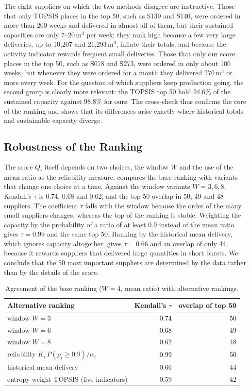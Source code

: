 \documentclass[11pt,a4paper]{article}
\begin{document}
The eight suppliers on which the two methods disagree are instructive.
Those that only TOPSIS places in the top 50, such as S139 and S140, were ordered in more than 200 weeks and delivered in almost all of them, but their sustained capacities are only 7--20\,m$^3$ per week; they rank high because a few very large deliveries, up to 10{,}207 and 21{,}293\,m$^3$, inflate their totals, and because the activity indicator rewards frequent small deliveries.
Those that only our score places in the top 50, such as S078 and S273, were ordered in only about 100 weeks, but whenever they were ordered for a month they delivered 270\,m$^3$ or more every week.
For the question of which suppliers keep production going, the second group is clearly more relevant: the TOPSIS top 50 hold 94.6\% of the sustained capacity against 98.8\% for ours.
The cross-check thus confirms the core of the ranking and shows that its differences arise exactly where historical totals and sustainable capacity diverge.

\subsection{Robustness of the Ranking}
The score $Q_i$ itself depends on two choices, the window $W$ and the use of the mean ratio as the reliability measure.
 compares the base ranking with variants that change one choice at a time.
Against the window variants $W=3,6,8$, Kendall's $\tau$ is 0.74, 0.68 and 0.62, and the top 50 overlap in 50, 49 and 48 suppliers.
The coefficient $\tau$ falls with the window because the order of the many small suppliers changes, whereas the top of the ranking is stable.
Weighting the capacity by the probability of a ratio of at least 0.9 instead of the mean ratio gives $\tau=0.99$ and the same top 50.
Ranking by the historical mean delivery, which ignores capacity altogether, gives $\tau=0.66$ and an overlap of only 44, because it rewards suppliers that delivered large quantities in short bursts.
We conclude that the 50 most important suppliers are determined by the data rather than by the details of the score.

\begin{table}[ht]
\centering
\caption{Agreement of the base ranking ($W=4$, mean ratio) with alternative rankings.}\label{tab:q1rob}
\small
\begin{tabular}{lrr}
\toprule
Alternative ranking & Kendall's $\tau$ & overlap of top 50 \\
\midrule
window $W=3$ & 0.74 & 50 \\
window $W=6$ & 0.68 & 49 \\
window $W=8$ & 0.62 & 48 \\
reliability $K_i\,P(\rho_i\ge 0.9)/\alpha_i$ & 0.99 & 50 \\
historical mean delivery & 0.66 & 44 \\
entropy-weight TOPSIS (five indicators) & 0.59 & 42 \\
\bottomrule
\end{tabular}
\end{table}
\end{document}
